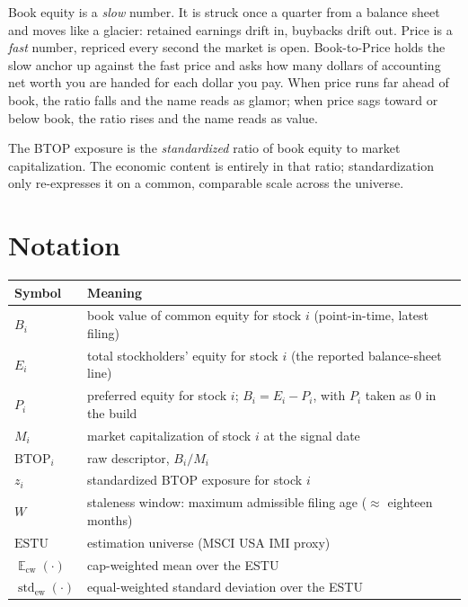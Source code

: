 \documentclass[11pt]{article}
\theoremstyle{definition}
\theoremstyle{plain}
\theoremstyle{remark}
\DeclareMathOperator{\std}{std}
\DeclareMathOperator*{\avg}{\mathbb{E}}
\begin{document}
\begin{intuition}
Book equity is a \emph{slow} number. It is struck once a quarter from a balance sheet and moves like a glacier: retained earnings drift in, buybacks drift out. Price is a \emph{fast} number, repriced every second the market is open. Book-to-Price holds the slow anchor up against the fast price and asks how many dollars of accounting net worth you are handed for each dollar you pay. When price runs far ahead of book, the ratio falls and the name reads as glamor; when price sags toward or below book, the ratio rises and the name reads as value.
\end{intuition}

\begin{keyresult}
The BTOP exposure is the \emph{standardized} ratio of book equity to market capitalization. The economic content is entirely in that ratio; standardization only re-expresses it on a common, comparable scale across the universe.
\end{keyresult}

\section*{Notation}

\begin{center}
\begin{tabular}{ll}
\toprule
Symbol & Meaning \\
\midrule
$B_i$ & book value of common equity for stock $i$ (point-in-time, latest filing) \\
$E_i$ & total stockholders' equity for stock $i$ (the reported balance-sheet line) \\
$P_i$ & preferred equity for stock $i$; $B_i = E_i - P_i$, with $P_i$ taken as $0$ in the build \\
$M_i$ & market capitalization of stock $i$ at the signal date \\
$\mathrm{BTOP}_i$ & raw descriptor, $B_i / M_i$ \\
$z_i$ & standardized BTOP exposure for stock $i$ \\
$W$ & staleness window: maximum admissible filing age ($\approx$ eighteen months) \\
$\mathrm{ESTU}$ & estimation universe (MSCI USA IMI proxy) \\
$\avg_{\mathrm{cw}}(\cdot)$ & cap-weighted mean over the ESTU \\
$\std_{\mathrm{ew}}(\cdot)$ & equal-weighted standard deviation over the ESTU \\
\bottomrule
\end{tabular}
\end{center}
\end{document}
